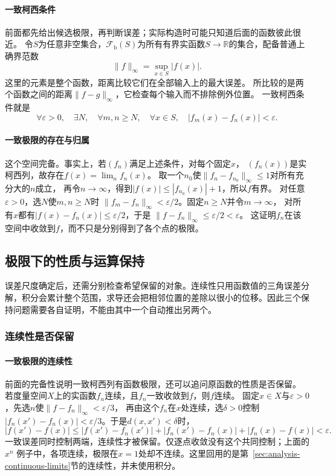 \paragraph{一致柯西条件}

前面都先给出候选极限，再判断误差；实际构造时可能只知道后面的函数彼此很近。
令$S$为任意非空集合，$\mathcal F_{\mathrm b}(S)$为所有有界实函数$S\to\mathbb{R}$的集合，配备普通上确界范数
\[   \lVert f\rVert_{\infty}   =   \sup_{x\in S}|f(x)|. \]
这里的元素是整个函数，距离比较它们在全部输入上的最大误差。
所比较的是两个函数之间的距离$\lVert f-g\rVert_\infty$，它检查每个输入而不排除例外位置。
一致柯西条件就是
\[
 \forall\varepsilon>0,\quad\exists N,\quad
 \forall m,n\geq N,\quad\forall x\in S,\quad
 |f_m(x)-f_n(x)|<\varepsilon.
\]

\paragraph{一致极限的存在与归属}

这个空间完备。事实上，若$(f_n)$满足上述条件，对每个固定$x$，
$(f_n(x))$是实柯西列，故存在$f(x)=\lim_n f_n(x)$。
取一个$n_0$使$\lVert f_n-f_{n_0}\rVert_\infty\leq1$对所有充分大的$n$成立，
再令$n\to\infty$，得到$|f(x)|\leq|f_{n_0}(x)|+1$，所以$f$有界。
对任意$\varepsilon>0$，选$N$使$m,n\geq N$时
$\lVert f_m-f_n\rVert_\infty<\varepsilon/2$。固定$n\geq N$并令$m\to\infty$，
对所有$x$都有$|f(x)-f_n(x)|\leq\varepsilon/2$，于是
$\lVert f-f_n\rVert_\infty\leq\varepsilon/2<\varepsilon$。
这证明$f_n$在该空间中收敛到$f$，而不只是分别得到了各个点的极限。

\subsection{极限下的性质与运算保持}

误差尺度确定后，还需分别检查希望保留的对象。连续性只用函数值的三角误差分解，积分会累计整个范围，求导还会把相邻位置的差除以很小的位移。因此三个保持问题需要各自证明，不能由其中一个自动推出另两个。

\subsubsection{连续性是否保留}

\paragraph{一致极限的连续性}

前面的完备性说明一致柯西列有函数极限，还可以追问原函数的性质是否保留。
若度量空间$X$上的实函数$f_n$连续，且$f_n$一致收敛到$f$，则$f$连续。
固定$x\in X$与$\varepsilon>0$，先选$n$使$\lVert f-f_n\rVert_\infty<\varepsilon/3$，
再由这个$f_n$在$x$处连续，选$\delta>0$控制
$|f_n(x')-f_n(x)|<\varepsilon/3$。于是$d(x,x')<\delta$时，
\[
 |f(x')-f(x)|
 \leq |f(x')-f_n(x')|+|f_n(x')-f_n(x)|+|f_n(x)-f(x)|
 <\varepsilon.
\]
一致误差同时控制两端，连续性才被保留。仅逐点收敛没有这个共同控制；上面的$x^n$
例子中，各项连续，极限在$x=1$处却不连续。这里回用的是第~\ref{sec:analysis-continuous-limits}节的连续性，并未使用积分。

